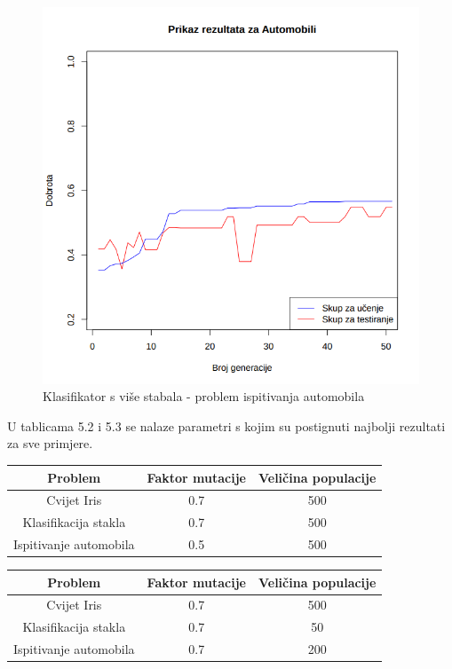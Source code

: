 \documentclass[times, utf8, zavrsni]{fer}
\begin{document}
\begin{figure}[htb]
\centering
\includegraphics[scale=0.45]{grafovi/automobili2-3}
\caption{Klasifikator s više stabala - problem ispitivanja automobila}
\end{figure}

\newpage
U tablicama 5.2 i 5.3 se nalaze parametri s kojim su postignuti najbolji rezultati za sve primjere.

\begin{table}[H]
\begin{center}
\begin{tabular}{| c | c | c |}
\hline
Problem & Faktor mutacije & Veličina populacije \\
\hline
Cvijet Iris & 0.7 & 500 \\
Klasifikacija stakla & 0.7 & 500 \\
Ispitivanje automobila & 0.5 & 500 \\
\hline
\end{tabular}
\end{center}
\end{table}
\begin{table}[H]
\begin{center}
\begin{tabular}{| c | c | c |}
\hline
Problem & Faktor mutacije & Veličina populacije \\
\hline
Cvijet Iris & 0.7 & 500 \\
Klasifikacija stakla & 0.7 & 50 \\
Ispitivanje automobila & 0.7 & 200 \\
\hline
\end{tabular}
\end{center}
\end{table}
\end{document}
